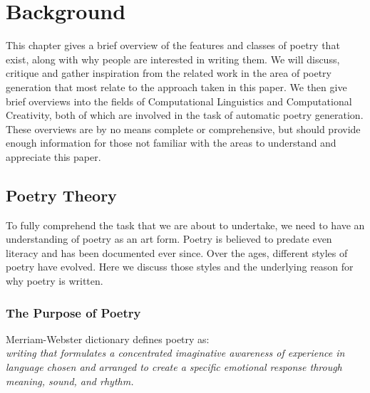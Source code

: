 
\chapter{Background}
\ifpdf
    \graphicspath{{Design/DesignFigs/PNG/}{Design/DesignFigs/PDF/}{Design/DesignFigs/}}
\else
    \graphicspath{{Design/DesignFigs/EPS/}{Design/DesignFigs/}}
\fi

This chapter gives a brief overview of the features and classes of poetry that exist, along with why people are interested in writing them. We will discuss, critique and gather inspiration from the related work in the area of poetry generation that most relate to the approach taken in this paper. We then give brief overviews into the fields of Computational Linguistics and Computational Creativity, both of which are involved in the task of automatic poetry generation. These overviews are by no means complete or comprehensive, but should provide enough information for those not familiar with the areas to understand and appreciate this paper.

\section{Poetry Theory}

To fully comprehend the task that we are about to undertake, we need to have an understanding of poetry as an art form. Poetry is believed to predate even literacy and has been documented ever since. Over the ages, different styles of poetry have evolved. Here we discuss those styles and the underlying reason for why poetry is written.

\subsection{The Purpose of Poetry}

Merriam-Webster dictionary defines poetry as:\\
\emph{writing that formulates a concentrated imaginative awareness of experience in language chosen and arranged to create a specific emotional response through meaning, sound, and rhythm.}

